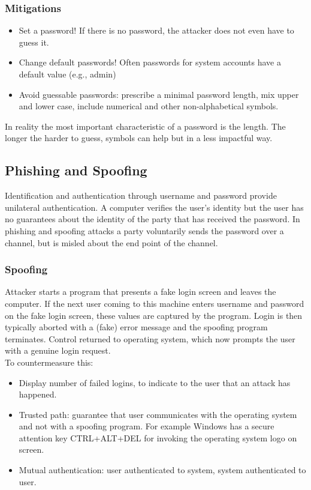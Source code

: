 \documentclass[a4paper, 10pt, titlepage]{article}
\begin{document}
\subsubsection*{Mitigations}
\begin{itemize}
\item Set a password! If there is no password, the attacker does not even have to guess it.
\item Change default passwords! Often passwords for system accounts have a default value (e.g., admin)
\item Avoid guessable passwords: prescribe a minimal password length, mix upper and lower case, include numerical and other non-alphabetical symbols.
\end{itemize}
In reality the most important characteristic of a password is the length. The longer the harder to guess, symbols can help but in a less impactful way.

\subsection{Phishing and Spoofing}
Identification and authentication through username and password provide unilateral authentication. A computer verifies the user’s identity but the user has no guarantees about the identity of the party that has received the password. In phishing and spoofing attacks a party voluntarily sends the password over a channel, but is misled about the end point of the channel.

\subsubsection*{Spoofing}
Attacker starts a program that presents a fake login screen and leaves the computer. If the next user coming to this machine enters username and password on the fake login screen, these values are captured by the program. Login is then typically aborted with a (fake) error message and the spoofing program terminates. Control returned to operating system, which now prompts the user with a genuine login request. \medskip \\
To countermeasure this:
\begin{itemize}
\item Display number of failed logins, to indicate to the user that an attack has happened.
\item Trusted path: guarantee that user communicates with the operating system and not with a spoofing program. For example Windows has a secure attention key CTRL+ALT+DEL for invoking the operating system logo on screen.
\item Mutual authentication: user authenticated to system, system authenticated to user.
\end{itemize}
\end{document}
